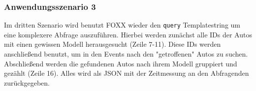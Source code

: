 \subsubsection{Anwendungsszenario 3}
Im dritten Szenario wird benutzt FOXX wieder den \texttt{query} Templatestring um eine komplexere Abfrage auszuführen. Hierbei werden zunächst alle IDs der Autos mit einen gewissen Modell herausgesucht (Zeile 7-11). Diese IDs werden anschließend benutzt, um in den Events nach den "getroffenen" Autos zu suchen. Abschließend werden die gefundenen Autos nach ihrem Modell gruppiert und gezählt (Zeile 16). Alles wird als \ac{JSON} mit der Zeitmessung an den Abfragenden zurückgegeben.
